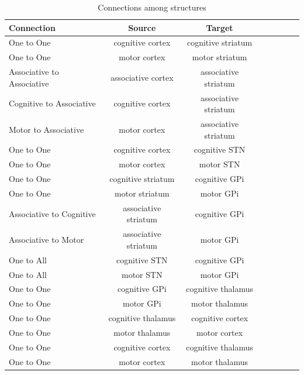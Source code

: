 \documentclass[11pt]{article}
\begin{document}
\begin{table}
\centering
\begin{tabular}{l*{6}{c}r}
Connection         &  Source  & Target \\
\hline
One to One                   & cognitive cortex & cognitive striatum  \\
One to One                   & motor cortex     & motor striatum  \\
Associative to Associative   & associative cortex & associative striatum  \\
Cognitive to Associative     & cognitive cortex & associative striatum  \\
Motor to Associative         & motor cortex & associative striatum  \\
One to One                   & cognitive cortex & cognitive STN  \\
One to One                   & motor cortex     & motor STN  \\
One to One                   & cognitive striatum & cognitive GPi  \\
One to One                   & motor striatum     & motor GPi  \\
Associative to Cognitive     & associative striatum  & cognitive GPi  \\
Associative to Motor         & associative striatum  & motor GPi  \\
One to All                   & cognitive STN & cognitive GPi  \\
One to All                   & motor STN     & motor GPi  \\
One to One                   & cognitive GPi & cognitive thalamus  \\
One to One                   & motor GPi     & motor thalamus  \\
One to One                   & cognitive thalamus & cognitive cortex  \\
One to One                   & motor thalamus     & motor cortex  \\
One to One                   & cognitive cortex & cognitive thalamus  \\
One to One                   & motor cortex     & motor thalamus  \\
\hline
\end{tabular}
\caption{Connections among structures}\label{table:connections}
\end{table}
\end{document}

